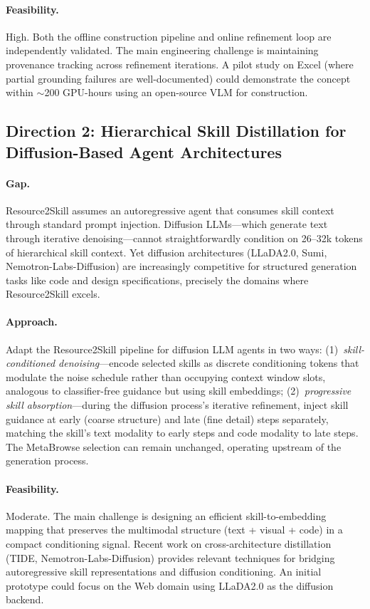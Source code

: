 \documentclass[11pt,a4paper]{article}
\begin{document}
\paragraph{Feasibility.}
High. Both the offline construction pipeline and online refinement loop are independently validated. The main engineering challenge is maintaining provenance tracking across refinement iterations. A pilot study on Excel (where partial grounding failures are well-documented) could demonstrate the concept within $\sim$200 GPU-hours using an open-source VLM for construction.

\subsection{Direction 2: Hierarchical Skill Distillation for Diffusion-Based Agent Architectures}

\paragraph{Gap.}
Resource2Skill assumes an autoregressive agent that consumes skill context through standard prompt injection. Diffusion LLMs---which generate text through iterative denoising---cannot straightforwardly condition on 26--32k tokens of hierarchical skill context. Yet diffusion architectures (LLaDA2.0, Sumi, Nemotron-Labs-Diffusion) are increasingly competitive for structured generation tasks like code and design specifications, precisely the domains where Resource2Skill excels.

\paragraph{Approach.}
Adapt the Resource2Skill pipeline for diffusion LLM agents in two ways: (1)~\emph{skill-conditioned denoising}---encode selected skills as discrete conditioning tokens that modulate the noise schedule rather than occupying context window slots, analogous to classifier-free guidance but using skill embeddings; (2)~\emph{progressive skill absorption}---during the diffusion process's iterative refinement, inject skill guidance at early (coarse structure) and late (fine detail) steps separately, matching the skill's text modality to early steps and code modality to late steps. The MetaBrowse selection can remain unchanged, operating upstream of the generation process.

\paragraph{Feasibility.}
Moderate. The main challenge is designing an efficient skill-to-embedding mapping that preserves the multimodal structure (text + visual + code) in a compact conditioning signal. Recent work on cross-architecture distillation (TIDE, Nemotron-Labs-Diffusion) provides relevant techniques for bridging autoregressive skill representations and diffusion conditioning. An initial prototype could focus on the Web domain using LLaDA2.0 as the diffusion backend.
\end{document}
